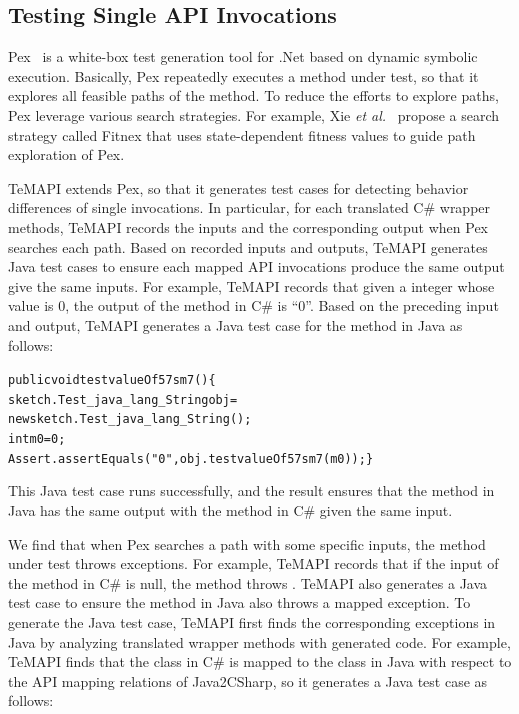 \subsection{Testing Single API Invocations}
\label{sec:approach:single}

Pex~\cite{tillmann2008pex} is a white-box test generation tool for .Net based on dynamic symbolic execution. Basically, Pex repeatedly executes a method under test, so that it explores all feasible paths of the method. To reduce the efforts to explore paths, Pex leverage various search strategies. For example, Xie \emph{et al.}~\cite{xie09:fitness} propose a search strategy called Fitnex that uses state-dependent fitness values to guide path exploration of Pex.

TeMAPI extends Pex, so that it generates test cases for detecting behavior differences of single invocations. In particular, for each translated C\# wrapper methods, TeMAPI records the inputs and the corresponding output when Pex searches each path. Based on recorded inputs and outputs, TeMAPI generates Java test cases to ensure each mapped API invocations produce the same output give the same inputs.
For example, TeMAPI records that given a integer whose value is 0, the output of the  method in C\# is ``0''. Based on the preceding input and output, TeMAPI generates a Java test case for the  method in Java as follows:

\begin{CodeOut}%
\begin{alltt}
public void testvalueOf57sm7()\{
  sketch.Test_java_lang_String obj =
      new sketch.Test_java_lang_String();
  int m0 = 0;
  Assert.assertEquals("0", obj.testvalueOf57sm7(m0));\}
\end{alltt}
\end{CodeOut}

This Java test case runs successfully, and the result ensures that the  method in Java has the same output with the  method in C\# given the same input.


We find that when Pex searches a path with some specific inputs, the method under test throws exceptions.
For example, TeMAPI records that if the input of the  method in C\# is null, the method throws . TeMAPI also generates a Java test case to ensure the  method in Java also throws a mapped exception. To generate the Java test case, TeMAPI first finds the corresponding exceptions in Java by analyzing translated wrapper methods with generated code. For example, TeMAPI finds that the  class in C\# is mapped to the  class in Java with respect to the API mapping relations of Java2CSharp, so it generates a Java test case as follows:

